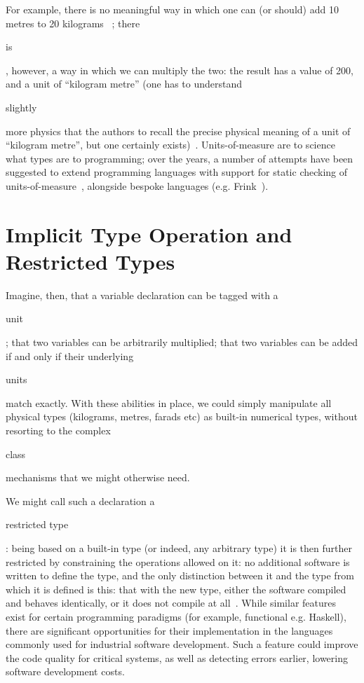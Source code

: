 \documentclass{eceasst}
\begin{document}
For example, there is no meaningful way in which one can (or should)
add 10 metres to 20 kilograms ~\cite{foster:2013};
there \begin{em}is\end{em}, however, a way in which we can multiply
the two: the result has a value of 200, and a unit of ``kilogram
metre'' (one has to understand \begin{em}slightly\end{em} more physics
that the authors to recall the precise physical meaning of a unit of
``kilogram metre'', but one certainly
exists)~\cite{siunits}. Units-of-measure are to science what types are
to programming; over the years, a number of attempts have been
suggested to extend programming languages with support for static
checking of
units-of-measure~\cite{kennedy:1997,erwig+burnett:2002,kennedy:2009},
alongside bespoke languages (e.g. Frink~\cite{frink}).

\section{Implicit Type Operation and Restricted Types}

Imagine, then, that a variable declaration can be tagged with
a \begin{em}unit\end{em}; that two variables can be arbitrarily
multiplied; that two variables can be added if and only if their
underlying \begin{em}units\end{em} match exactly. With these abilities
in place, we could simply manipulate all physical types (kilograms,
metres, farads etc) as built-in numerical types, without resorting to
the complex \begin{em}class\end{em} mechanisms that we might otherwise
need.

We might call such a declaration a \begin{em}restricted type\end{em}:
being based on a built-in type (or indeed, any arbitrary type) it is
then further restricted by constraining the operations allowed on it:
no additional software is written to define the type, and the only
distinction between it and the type from which it is defined is this:
that with the new type, either the software compiled and behaves
identically, or it does not compile at
all~\cite{donaghy+crick:2014}. While similar features exist for
certain programming paradigms (for example, functional e.g. Haskell),
there are significant opportunities for their implementation in the
languages commonly used for industrial software development. Such a
feature could improve the code quality for critical systems, as well
as detecting errors earlier, lowering software development costs.
\end{document}
